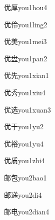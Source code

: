 \begin{verbete}[6;9]{优厚}{you1hou4}
\end{verbete}

\begin{verbete}[6;7]{优伶}{you1ling2}
\end{verbete}

\begin{verbete}[6;9]{优美}{you1mei3}
\end{verbete}

\begin{verbete}[6;11]{优盘}{you1pan2}
\end{verbete}

\begin{verbete}[6;6]{优先}{you1xian1}
\end{verbete}

\begin{verbete}[6;7]{优秀}{you1xiu4}
\end{verbete}

\begin{verbete}[6;9]{优选}{you1xuan3}
\end{verbete}

\begin{verbete}[6;3]{优于}{you1yu2}
\end{verbete}

\begin{verbete}[6;12]{优裕}{you1yu4}
\end{verbete}

\begin{verbete}[6;8]{优质}{you1zhi4}
\end{verbete}

\begin{verbete}[7;5]{邮包}{you2bao1}
\end{verbete}

\begin{verbete}[7;10]{邮递}{you2di4}
\end{verbete}

\begin{verbete*}[7;5]{邮电}{you2dian4}
\end{verbete*}

